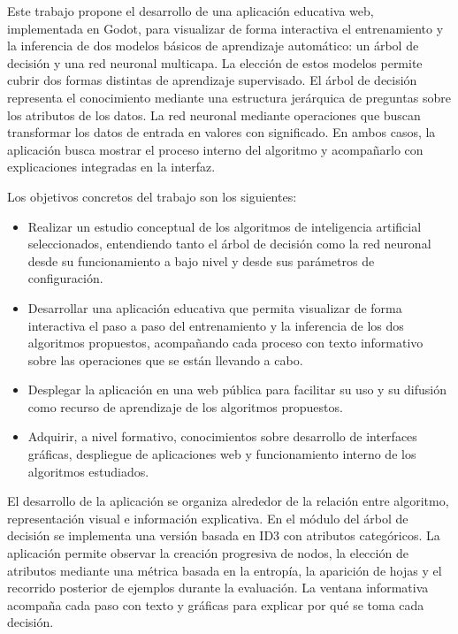 Este trabajo propone el desarrollo de una aplicación educativa web, implementada en Godot, para visualizar de forma interactiva el entrenamiento y la inferencia de dos modelos básicos de aprendizaje automático: un árbol de decisión y una red neuronal multicapa. La elección de estos modelos permite cubrir dos formas distintas de aprendizaje supervisado. El árbol de decisión representa el conocimiento mediante una estructura jerárquica de preguntas sobre los atributos de los datos. La red neuronal mediante operaciones que buscan transformar los datos de entrada en valores con significado. En ambos casos, la aplicación busca mostrar el proceso interno del algoritmo y acompañarlo con explicaciones integradas en la interfaz.

Los objetivos concretos del trabajo son los siguientes:

\begin{itemize}
  \item Realizar un estudio conceptual de los algoritmos de inteligencia artificial seleccionados, entendiendo tanto el árbol de decisión como la red neuronal desde su funcionamiento a bajo nivel y desde sus parámetros de configuración.
  \item Desarrollar una aplicación educativa que permita visualizar de forma interactiva el paso a paso del entrenamiento y la inferencia de los dos algoritmos propuestos, acompañando cada proceso con texto informativo sobre las operaciones que se están llevando a cabo.
  \item Desplegar la aplicación en una web pública para facilitar su uso y su difusión como recurso de aprendizaje de los algoritmos propuestos.
  \item Adquirir, a nivel formativo, conocimientos sobre desarrollo de interfaces gráficas, despliegue de aplicaciones web y funcionamiento interno de los algoritmos estudiados.
\end{itemize}

El desarrollo de la aplicación se organiza alrededor de la relación entre algoritmo, representación visual e información explicativa. En el módulo del árbol de decisión se implementa una versión basada en ID3 con atributos categóricos. La aplicación permite observar la creación progresiva de nodos, la elección de atributos mediante una métrica basada en la entropía, la aparición de hojas y el recorrido posterior de ejemplos durante la evaluación. La ventana informativa acompaña cada paso con texto y gráficas para explicar por qué se toma cada decisión.

